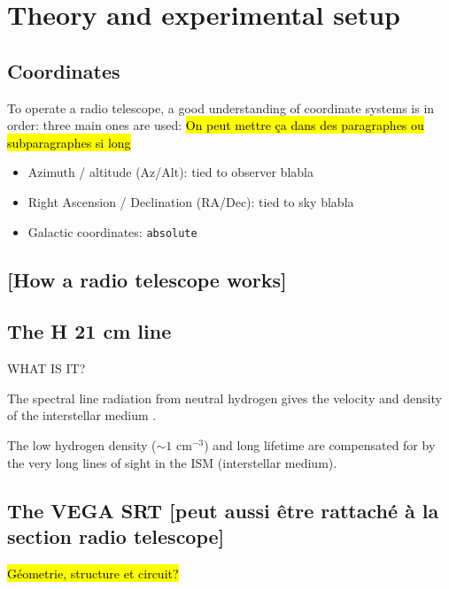 \section{Theory and experimental setup}
\subsection{Coordinates}
To operate a radio telescope, a good understanding of coordinate systems is in order:
three main ones are used: \hl{On peut mettre ça dans des paragraphes ou subparagraphes si long}
\begin{itemize}
    \item Azimuth / altitude (Az/Alt): tied to observer blabla
    \item Right Ascension / Declination (RA/Dec): tied to sky blabla
    \item Galactic coordinates: \verb|absolute|
\end{itemize}
\subsection{[How a radio telescope works]}

\subsection{The H 21 cm line}
WHAT IS IT?

The spectral line radiation from neutral hydrogen gives the velocity and density of the interstellar medium \cite{burke_introduction_2013}.

The low hydrogen density ($\sim 1$ cm$^{-3}$) and long lifetime are compensated for by the very long lines of sight in the ISM (interstellar medium)\cite{burke_introduction_2013}.


\subsection{The VEGA SRT [peut aussi être rattaché à la section radio telescope]}
\hl{Géometrie, structure et circuit?}
\cite{installation_manual_2022}
\cite{interdisciplinary_project_2022}
